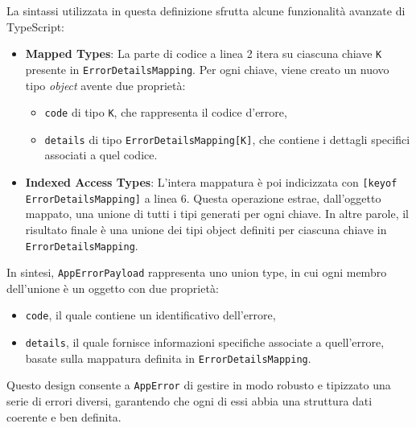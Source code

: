 \newpage

La sintassi utilizzata in questa definizione sfrutta alcune funzionalità avanzate di TypeScript:
\begin{itemize}
  \item \textbf{Mapped Types}: La parte di codice a linea 2 itera su ciascuna chiave \texttt{K} presente in \texttt{ErrorDetailsMapping}. Per ogni chiave, viene creato un nuovo tipo \textit{object} avente due proprietà:
    \begin{itemize}
      \item \texttt{code} di tipo \texttt{K}, che rappresenta il codice d’errore,
      \item \texttt{details} di tipo \texttt{ErrorDetailsMapping[K]}, che contiene i dettagli specifici associati a quel codice.
    \end{itemize}

  \item \textbf{Indexed Access Types}: L'intera mappatura è poi indicizzata con \texttt{[keyof ErrorDetailsMapping]} a linea 6. Questa operazione estrae, dall'oggetto mappato, una unione di tutti i tipi generati per ogni chiave. In altre parole, il risultato finale è una unione dei tipi object definiti per ciascuna chiave in \texttt{ErrorDetailsMapping}.
\end{itemize}

In sintesi, \texttt{AppErrorPayload} rappresenta uno union type, in cui ogni membro dell'unione è un oggetto con due proprietà:
\begin{itemize}
  \item \texttt{code}, il quale contiene un identificativo dell'errore,
  \item \texttt{details}, il quale fornisce informazioni specifiche associate a quell'errore, basate sulla mappatura definita in \texttt{ErrorDetailsMapping}.
\end{itemize}

Questo design consente a \texttt{AppError} di gestire in modo robusto e tipizzato una serie di errori diversi, garantendo che ogni di essi abbia una struttura dati coerente e ben definita.
